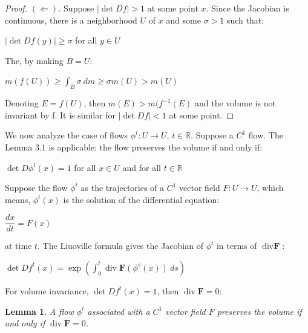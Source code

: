 \documentclass[a4paper,12pt] {article}
\newtheorem{lemma}{Lemma}[section]
\begin{document}
\begin{proof}[Proof. \( (\Leftarrow) \)]Suppose $|\det Df| > 1$ at some point $x$. Since the Jacobian is continuous, there is a neighborhood $U$ of $x$ and some $\sigma > 1$ such that:

\begin{center}
    $|\det Df(y)| \geq \sigma$ for all $y \in U$ 
\end{center}

 The, by making $B = U$:

\begin{center}
    $m(f(U)) \geq \displaystyle \int_B \sigma\ dm \geq \sigma m(U) > m(U)$
\end{center}

 Denoting $E = f(U)$, then $m(E) > m(f^{-1}(E)$ and the volume is not invariant by f. It is similar for $|\det Df| < 1$ at some point.
\end{proof}

 We now analyze the case of flows $\phi^t : U \to U$, $t \in \mathbb{R}$. Suppose a $C^1$ flow. The Lemma 3.1 is applicable: the flow preserves the volume if and only if:

\begin{center}
    $\det D\phi^t(x) = 1$ for all $x \in U$ and for all $t \in \mathbb{R}$
\end{center}

 Suppose the flow $\phi^t$ as the trajectories of a $C^1$ vector field $F : U \to U$, which means, $\phi^t(x)$ is the solution of the differential equation:

\begin{center}
    $\dfrac{dx}{dt} = F(x)$
\end{center}

\noindent at time $t$. The Liuoville formula gives the Jacobian of $\phi^t$ in terms of $\operatorname{div} \textbf{F}$:

\begin{center}
        $\det Df^t(x) = \exp{\left(\displaystyle \int_0^t \operatorname{div} \textbf{F}(\phi^s(x))\ ds\right)}$
\end{center}

 For volume invariance, $\det Df^t(x) = 1$, then $\operatorname{div} \textbf{F} = 0$:\\

\begin{lemma}
    A flow $\phi^t$ associated with a $C^1$ vector field $F$ preserves the volume if and only if $\operatorname{div}\textbf{F} = 0$.
\end{lemma}
\end{document}
